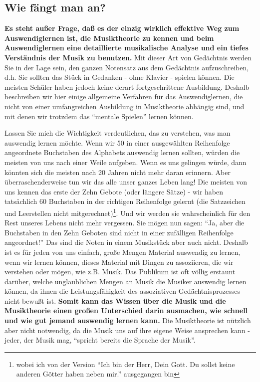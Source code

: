 
\subsection{Wie fängt man an?}\hypertarget{c1iii6e}{}

\textbf{Es steht außer Frage, daß es der einzig wirklich effektive Weg zum Auswendiglernen ist, die Musiktheorie zu kennen und beim Auswendiglernen eine detaillierte musikalische Analyse und ein tiefes Verständnis der Musik zu benutzen.}
Mit dieser Art von Gedächtnis werden Sie in der Lage sein, den ganzen Notensatz aus dem Gedächtnis aufzuschreiben, d.h. Sie sollten das Stück in Gedanken - ohne Klavier - spielen können.
Die meisten Schüler haben jedoch keine derart fortgeschrittene Ausbildung.
Deshalb beschreiben wir hier einige allgemeine Verfahren für das Auswendiglernen, die nicht von einer umfangreichen Ausbildung in Musiktheorie abhängig sind, und mit denen wir trotzdem das \enquote{mentale Spielen} lernen können.

Lassen Sie mich die Wichtigkeit verdeutlichen, das zu verstehen, was man auswendig lernen möchte.
Wenn wir 50 in einer ausgewählten Reihenfolge angeordnete Buchstaben des Alphabets auswendig lernen sollten, würden die meisten von uns nach einer Weile aufgeben.
Wenn es uns gelingen würde, dann könnten sich die meisten nach 20 Jahren nicht mehr daran erinnern.
Aber überraschenderweise tun wir das alle unser ganzes Leben lang!
Die meisten von uns kennen das erste der Zehn Gebote (oder längere Sätze) - wir haben tatsächlich 60 Buchstaben in der richtigen Reihenfolge gelernt (die Satzzeichen und Leerstellen nicht mitgerechnet)\footnote{wobei ich von der Version \enquote{Ich bin der Herr, Dein Gott. Du sollst keine anderen Götter haben neben mir.} ausgegangen bin}.
Und wir werden sie wahrscheinlich für den Rest unseres Lebens nicht mehr vergessen.
Sie mögen nun sagen: \enquote{Ja, aber die Buchstaben in den Zehn Geboten sind nicht in einer zufälligen Reihenfolge angeordnet!}
Das sind die Noten in einem Musikstück aber auch nicht.
Deshalb ist es für jeden von uns einfach, große Mengen Material auswendig zu lernen, wenn wir lernen können, dieses Material mit Dingen zu assoziieren, die wir verstehen oder mögen, wie z.B. Musik.
Das Publikum ist oft völlig erstaunt darüber, welche unglaublichen Mengen an Musik die Musiker auswendig lernen können, da ihnen die Leistungsfähigkeit des assoziativen Gedächtnisprozesses nicht bewußt ist.
\textbf{Somit kann das Wissen über die Musik und die Musiktheorie einen großen Unterschied darin ausmachen, wie schnell und wie gut jemand auswendig lernen kann.}
Die Musiktheorie ist nützlich aber nicht notwendig, da die Musik uns auf ihre eigene Weise ansprechen kann - jeder, der Musik mag, \enquote{spricht bereits die Sprache der Musik}.

